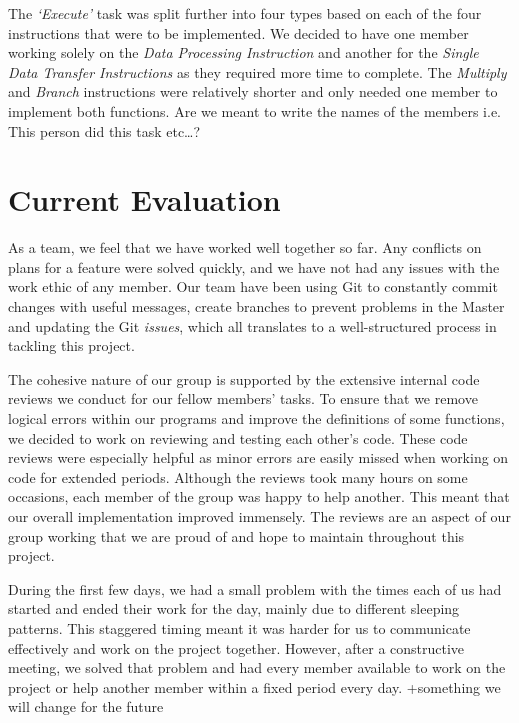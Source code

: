 \documentclass[11pt]{article}
\begin{document}
The \textsl{‘Execute’} task was split further into four types based on each of the four instructions that were to be
implemented. We decided to have one member working solely on the \textsl{Data Processing Instruction} and another
for the \textsl{Single Data Transfer Instructions} as they required more time to complete. The \textsl{Multiply} and \textsl{Branch}
instructions were relatively shorter and only needed one member to implement both functions.
Are we meant to write the names of the members i.e. This person did this task etc…?

\section*{Current Evaluation}
As a team, we feel that we have worked well together so far. Any conflicts on plans for a feature were solved
quickly, and we have not had any issues with the work ethic of any member. Our team have been using Git to
constantly commit changes with useful messages, create branches to prevent problems in the Master and
updating the Git \textsl{issues}, which all translates to a well-structured process in tackling this project.


The cohesive nature of our group is supported by the extensive internal code reviews we conduct for our
fellow members’ tasks. To ensure that we remove logical errors within our programs and improve the
definitions of some functions, we decided to work on reviewing and testing each other’s code. These code
reviews were especially helpful as minor errors are easily missed when working on code for extended periods.
Although the reviews took many hours on some occasions, each member of the group was happy to help
another. This meant that our overall implementation improved immensely. The reviews are an aspect of our
group working that we are proud of and hope to maintain throughout this project.


During the first few days, we had a small problem with the times each of us had started and ended their work
for the day, mainly due to different sleeping patterns. This staggered timing meant it was harder for us to
communicate effectively and work on the project together. However, after a constructive meeting, we solved
that problem and had every member available to work on the project or help another member within a fixed
period every day.
+something we will change for the future 
\end{document}
